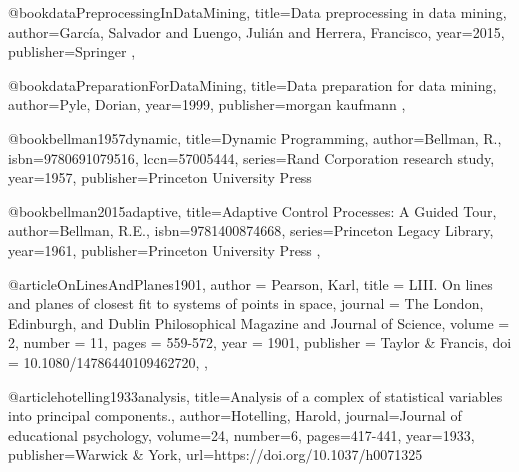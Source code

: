@book{dataPreprocessingInDataMining,
  title={Data preprocessing in data mining},
  author={García, Salvador and Luengo, Julián and Herrera, Francisco},
  year={2015},
  publisher={Springer}
},

@book{dataPreparationForDataMining,
  title={Data preparation for data mining},
  author={Pyle, Dorian},
  year={1999},
  publisher={morgan kaufmann}
},

@book{bellman1957dynamic,
  title={Dynamic Programming},
  author={Bellman, R.},
  isbn={9780691079516},
  lccn={57005444},
  series={Rand Corporation research study},
  year={1957},
  publisher={Princeton University Press}
}

@book{bellman2015adaptive,
  title={Adaptive Control Processes: A Guided Tour},
  author={Bellman, R.E.},
  isbn={9781400874668},
  series={Princeton Legacy Library},
  year={1961},
  publisher={Princeton University Press}
},

@article{OnLinesAndPlanes1901,
author = {Pearson, Karl},
title = {LIII. On lines and planes of closest fit to systems of points in space},
journal = {The London, Edinburgh, and Dublin Philosophical Magazine and Journal of Science},
volume = {2},
number = {11},
pages = {559-572},
year  = {1901},
publisher = {Taylor & Francis},
doi = {10.1080/14786440109462720},
},

@article{hotelling1933analysis,
  title={Analysis of a complex of statistical variables into principal components.},
  author={Hotelling, Harold},
  journal={Journal of educational psychology},
  volume={24},
  number={6},
  pages={417-441},
  year={1933},
  publisher={Warwick \& York},
  url={https://doi.org/10.1037/h0071325}
}

